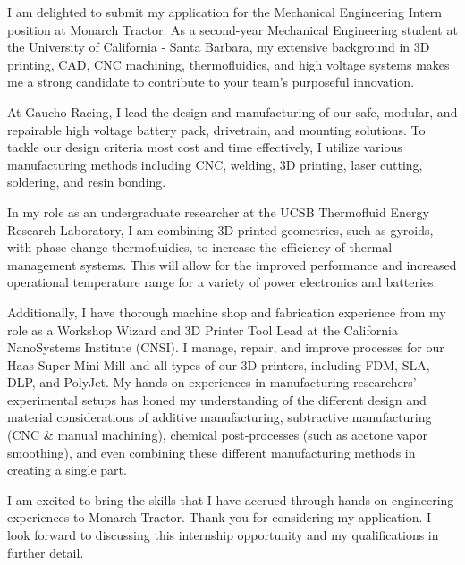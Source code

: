 \documentclass[11pt, letterpaper]{awesome-cv} %
\begin{document}
\makecvheader %

\makelettertitle %


\begin{cvletter}


I am delighted to submit my application for the Mechanical Engineering Intern position at Monarch Tractor. As a second-year Mechanical Engineering student at the University of California - Santa Barbara, my extensive background in 3D printing, CAD, CNC machining, thermofluidics, and high voltage systems makes me a strong candidate to contribute to your team's purposeful innovation.

At Gaucho Racing, I lead the design and manufacturing of our safe, modular, and repairable high voltage battery pack, drivetrain, and mounting solutions. To tackle our design criteria most cost and time effectively, I utilize various manufacturing methods including CNC, welding, 3D printing, laser cutting, soldering, and resin bonding. 

In my role as an undergraduate researcher at the UCSB Thermofluid Energy Research Laboratory, I am combining 3D printed geometries, such as gyroids, with phase-change thermofluidics, to increase the efficiency of thermal management systems. This will allow for the improved performance and increased operational temperature range for a variety of power electronics and batteries.

Additionally, I have thorough machine shop and fabrication experience from my role as a Workshop Wizard and 3D Printer Tool Lead at the California NanoSystems Institute (CNSI). I manage, repair, and improve processes for our Haas Super Mini Mill and all types of our 3D printers, including FDM, SLA, DLP, and PolyJet. My hands-on experiences in manufacturing researchers' experimental setups has honed my understanding of the different design and material considerations of additive manufacturing, subtractive manufacturing (CNC \& manual machining), chemical post-processes (such as acetone vapor smoothing), and even combining these different manufacturing methods in creating a single part.

I am excited to bring the skills that I have accrued through hands-on engineering experiences to Monarch Tractor. Thank you for considering my application. I look forward to discussing this internship opportunity and my qualifications in further detail.


\end{cvletter}


\makeletterclosing %
\end{document}
